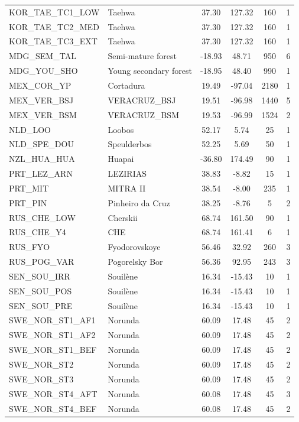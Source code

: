 \documentclass[11pt,twoside]{reedthesis}
\begin{document}
\begin{longtable}[t]{l>{\centering\arraybackslash}p{12em}cccc}
KOR\_TAE\_TC1\_LOW & Taehwa & 37.30 & 127.32 & 160 & 1\\
KOR\_TAE\_TC2\_MED & Taehwa & 37.30 & 127.32 & 160 & 1\\
KOR\_TAE\_TC3\_EXT & Taehwa & 37.30 & 127.32 & 160 & 1\\
MDG\_SEM\_TAL & Semi-mature forest & -18.93 & 48.71 & 950 & 6\\
MDG\_YOU\_SHO & Young secondary forest & -18.95 & 48.40 & 990 & 1\\
MEX\_COR\_YP & Cortadura & 19.49 & -97.04 & 2180 & 1\\
MEX\_VER\_BSJ & VERACRUZ\_BSJ & 19.51 & -96.98 & 1440 & 5\\
MEX\_VER\_BSM & VERACRUZ\_BSM & 19.53 & -96.99 & 1524 & 2\\
NLD\_LOO & Loobos & 52.17 & 5.74 & 25 & 1\\
NLD\_SPE\_DOU & Speulderbos & 52.25 & 5.69 & 50 & 1\\
NZL\_HUA\_HUA & Huapai & -36.80 & 174.49 & 90 & 1\\
PRT\_LEZ\_ARN & LEZIRIAS & 38.83 & -8.82 & 15 & 1\\
PRT\_MIT & MITRA II & 38.54 & -8.00 & 235 & 1\\
PRT\_PIN & Pinheiro da Cruz & 38.25 & -8.76 & 5 & 2\\
RUS\_CHE\_LOW & Cherskii & 68.74 & 161.50 & 90 & 1\\
RUS\_CHE\_Y4 & CHE & 68.74 & 161.41 & 6 & 1\\
RUS\_FYO & Fyodorovskoye & 56.46 & 32.92 & 260 & 3\\
RUS\_POG\_VAR & Pogorelsky Bor & 56.36 & 92.95 & 243 & 3\\
SEN\_SOU\_IRR & Souilène & 16.34 & -15.43 & 10 & 1\\
SEN\_SOU\_POS & Souilène & 16.34 & -15.43 & 10 & 1\\
SEN\_SOU\_PRE & Souilène & 16.34 & -15.43 & 10 & 1\\
SWE\_NOR\_ST1\_AF1 & Norunda & 60.09 & 17.48 & 45 & 2\\
SWE\_NOR\_ST1\_AF2 & Norunda & 60.09 & 17.48 & 45 & 2\\
SWE\_NOR\_ST1\_BEF & Norunda & 60.09 & 17.48 & 45 & 2\\
SWE\_NOR\_ST2 & Norunda & 60.09 & 17.48 & 45 & 2\\
SWE\_NOR\_ST3 & Norunda & 60.09 & 17.48 & 45 & 2\\
SWE\_NOR\_ST4\_AFT & Norunda & 60.08 & 17.48 & 45 & 3\\
SWE\_NOR\_ST4\_BEF & Norunda & 60.08 & 17.48 & 45 & 2\\

\end{longtable}
\end{document}
